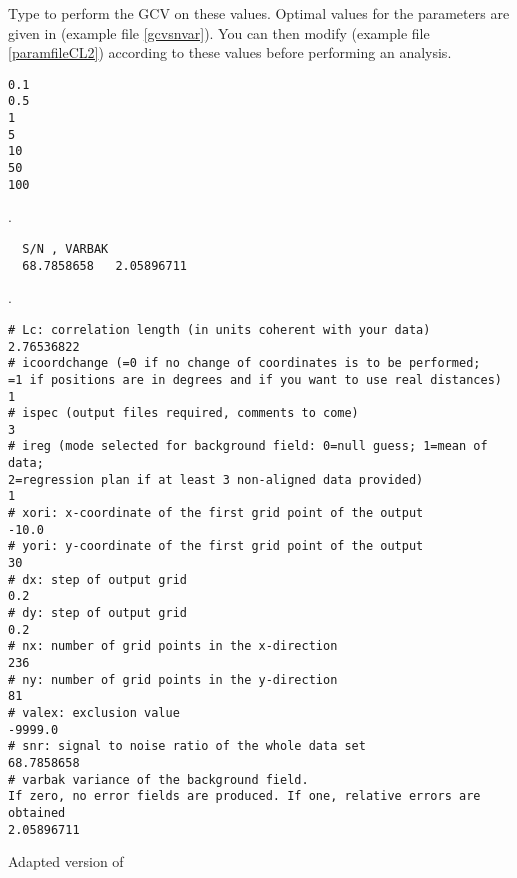 Type  to perform the GCV on these values. Optimal values for the parameters are given in  (example file \ref{gcvsnvar}). You can then modify  (example file \ref{paramfileCL2}) according to these values before performing an analysis. 

\begin{exfile}[H]
\begin{footnotesize}
\begin{verbatim}
0.1
0.5
1
5
10
50
100
\end{verbatim}
\end{footnotesize}
\caption{. \label{gcvsampling}}
\end{exfile}


\begin{exfile}[H]
\begin{footnotesize}
\begin{verbatim}
  S/N , VARBAK
  68.7858658   2.05896711
\end{verbatim}
\end{footnotesize}
\caption{. \label{gcvsnvar}}
\end{exfile}



\begin{exfile}[htpb]
\begin{footnotesize}
\begin{verbatim}
# Lc: correlation length (in units coherent with your data)
2.76536822
# icoordchange (=0 if no change of coordinates is to be performed; 
=1 if positions are in degrees and if you want to use real distances)
1
# ispec (output files required, comments to come)
3
# ireg (mode selected for background field: 0=null guess; 1=mean of data; 
2=regression plan if at least 3 non-aligned data provided)
1
# xori: x-coordinate of the first grid point of the output
-10.0
# yori: y-coordinate of the first grid point of the output
30
# dx: step of output grid
0.2
# dy: step of output grid
0.2
# nx: number of grid points in the x-direction
236
# ny: number of grid points in the y-direction
81
# valex: exclusion value
-9999.0
# snr: signal to noise ratio of the whole data set
68.7858658   
# varbak variance of the background field. 
If zero, no error fields are produced. If one, relative errors are obtained
2.05896711
\end{verbatim}
\end{footnotesize}
\caption{Adapted version of \label{paramfileCL2}}
\end{exfile}


